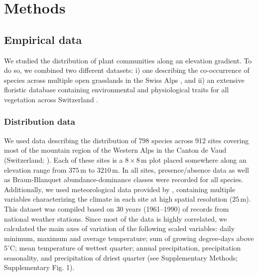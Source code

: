 \documentclass[11pt, a4paper]{article}
\begin{document}


 
\section*{Methods}
\subsection*{Empirical data}
We studied the distribution of plant communities along an elevation gradient. To do so, we combined two different datasets: i) one describing the co-occurrence of species across multiple open grasslands in the Swiss Alps \citep{randinClimateChangePlant2009}, and ii) an extensive floristic database containing environmental and physiological traits for all vegetation across Switzerland \citep{landoltFloraIndicativaOkologische2010}. 

\subsubsection*{Distribution data}
We used data describing the distribution of 798 species across 912 sites covering most of the mountain region of the Western Alps in the Canton de Vaud (Switzerland; \citealt{scherrerEcologicalIndicatorValues2019}). Each of these sites is a $8\times 8\,\text{m}$ plot placed somewhere along an elevation range from $375\,\text{m}$ to $3210\,\text{m}$. In all sites, presence/absence data as well as Braun-Blanquet abundance-dominance classes were recorded for all species. Additionally, we used meteorological data provided by \citet{scherrerEcologicalIndicatorValues2019}, containing multiple variables characterizing the climate in each site at high spatial resolution ($25\,\text{m}$). This dataset was compiled based on 30 years (1961–1990) of records from national weather stations. Since most of the data is highly correlated, we calculated the main axes of variation of the following scaled variables: daily minimum, maximum and average temperature; sum of growing degree-days above $5^{\circ}\text{C}$; mean temperature of wettest quarter; annual precipitation, precipitation seasonality, and precipitation of driest quarter (see Supplementary Methods; Supplementary Fig. 1).  %
\end{document}
